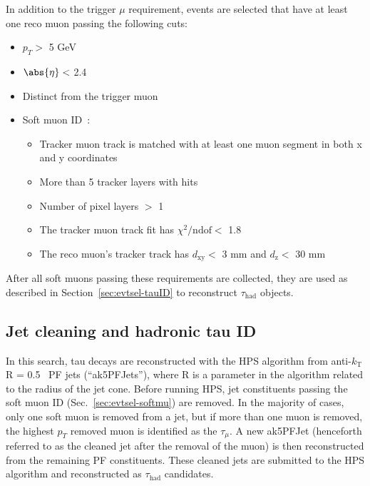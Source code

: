 In addition to the trigger $\mu$ requirement, events are selected that have at least one reco muon passing the following cuts:
\begin{itemize}
	\item $p_T >$ 5 GeV
	\item $\abs{\eta} <$ 2.4
	\item Distinct from the trigger muon
	\item Soft muon ID~\cite{CMS:2010uta}:
	\begin{itemize}
		\item Tracker muon track is matched with at least one muon segment in both \unit{x} and y coordinates
		\item More than 5 tracker layers with hits
		\item Number of pixel layers $>$ 1
		\item The tracker muon track fit has $\chi^{2}/\text{ndof} <$ 1.8
		\item The reco muon's tracker track has $d_{\text{xy}} <$ 3 mm and $d_{\text{z}} <$ 30 mm
	\end{itemize}
\end{itemize}
After all soft muons passing these requirements are collected, they are used as described in Section~\ref{sec:evtsel-tauID} to reconstruct $\tau_{\text{had}}$ objects.

\subsection{Jet cleaning and hadronic tau ID\label{sec:evtsel-tauID}}

In this search, tau decays are reconstructed with the HPS algorithm from anti-$k_{\text{T}}$ R = 0.5~\cite{1126-6708-2008-04-063} PF jets (``ak5PFJets''), where R is a parameter in the algorithm related to the radius of the jet cone. Before running HPS, jet constituents passing the soft muon ID (Sec.~\ref{sec:evtsel-softmu}) are removed. In the majority of cases, only one soft muon is removed from a jet, but if more than one muon is removed, the highest $p_T$ removed muon is identified as the $\tau_{\mu}$. A new ak5PFJet (henceforth referred to as the cleaned jet after the removal of the muon) is then reconstructed from the remaining PF constituents. These cleaned jets are submitted to the HPS algorithm and reconstructed as $\tau_{\text{had}}$ candidates.

